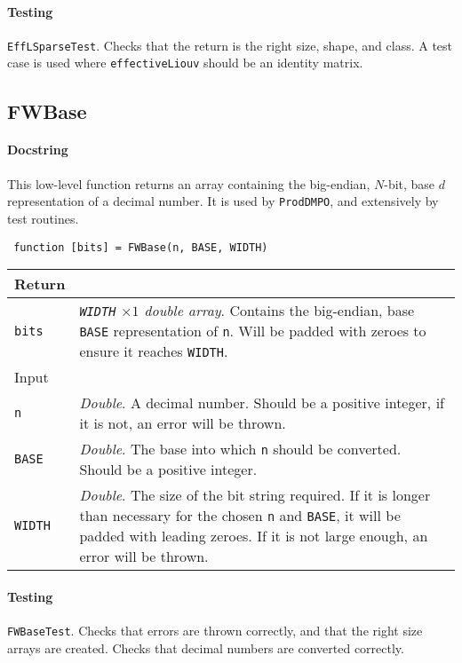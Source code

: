  \paragraph{Testing} \lstinline$EffLSparseTest$. Checks that the return is the right size, shape, and class. A test case is used where \lstinline$effectiveLiouv$ should be an identity matrix. 
 
 \subsection{FWBase}
 \paragraph{Docstring} This low-level function returns an array containing the big-endian, \(N\)-bit, base \(d\) representation of a decimal number. It is used by \lstinline$ProdDMPO$, and extensively by test routines. 
 \begin{lstlisting}
 function [bits] = FWBase(n, BASE, WIDTH) \end{lstlisting}
 \begin{longtabu}{X[1,l]X[4,l]}
 \hline
 Return & \\ \hline
 \lstinline$bits$ & \emph{\lstinline$WIDTH$ \(\times 1\) double array}. Contains the big-endian, base \lstinline$BASE$ representation of \lstinline$n$. Will be padded with zeroes to ensure it reaches \lstinline$WIDTH$. \\ \hline
 Input & \\ \hline
 \lstinline$n$ & \emph{Double}. A decimal number. Should be a positive integer, if it is not, an error will be thrown. \\
 \lstinline$BASE$ & \emph{Double}. The base into which \lstinline$n$ should be converted. Should be a positive integer. \\
 \lstinline$WIDTH$ & \emph{Double}. The size of the bit string required. If it is longer than necessary for the chosen \lstinline$n$ and \lstinline$BASE$, it will be padded with leading zeroes. If it is not large enough, an error will be thrown. \\
 \hline
 \end{longtabu}
 \paragraph{Testing} \lstinline$FWBaseTest$. Checks that errors are thrown correctly, and that the right size arrays are created. Checks that decimal numbers are converted correctly.

